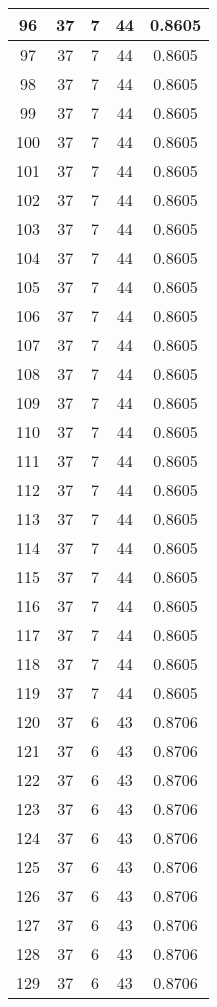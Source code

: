 \documentclass[letterpaper, 12pt]{article}
\begin{document}
\begin{longtable}{|c|c|c|c|c|}
\hline
96 & 37 & 7 & 44 & 0.8605 \\
\hline
97 & 37 & 7 & 44 & 0.8605 \\
\hline
98 & 37 & 7 & 44 & 0.8605 \\
\hline
99 & 37 & 7 & 44 & 0.8605 \\
\hline
100 & 37 & 7 & 44 & 0.8605 \\
\hline
101 & 37 & 7 & 44 & 0.8605 \\
\hline
102 & 37 & 7 & 44 & 0.8605 \\
\hline
103 & 37 & 7 & 44 & 0.8605 \\
\hline
104 & 37 & 7 & 44 & 0.8605 \\
\hline
105 & 37 & 7 & 44 & 0.8605 \\
\hline
106 & 37 & 7 & 44 & 0.8605 \\
\hline
107 & 37 & 7 & 44 & 0.8605 \\
\hline
108 & 37 & 7 & 44 & 0.8605 \\
\hline
109 & 37 & 7 & 44 & 0.8605 \\
\hline
110 & 37 & 7 & 44 & 0.8605 \\
\hline
111 & 37 & 7 & 44 & 0.8605 \\
\hline
112 & 37 & 7 & 44 & 0.8605 \\
\hline
113 & 37 & 7 & 44 & 0.8605 \\
\hline
114 & 37 & 7 & 44 & 0.8605 \\
\hline
115 & 37 & 7 & 44 & 0.8605 \\
\hline
116 & 37 & 7 & 44 & 0.8605 \\
\hline
117 & 37 & 7 & 44 & 0.8605 \\
\hline
118 & 37 & 7 & 44 & 0.8605 \\
\hline
119 & 37 & 7 & 44 & 0.8605 \\
\hline
120 & 37 & 6 & 43 & 0.8706 \\
\hline
121 & 37 & 6 & 43 & 0.8706 \\
\hline
122 & 37 & 6 & 43 & 0.8706 \\
\hline
123 & 37 & 6 & 43 & 0.8706 \\
\hline
124 & 37 & 6 & 43 & 0.8706 \\
\hline
125 & 37 & 6 & 43 & 0.8706 \\
\hline
126 & 37 & 6 & 43 & 0.8706 \\
\hline
127 & 37 & 6 & 43 & 0.8706 \\
\hline
128 & 37 & 6 & 43 & 0.8706 \\
\hline
129 & 37 & 6 & 43 & 0.8706 \\

\end{longtable}
\end{document}
